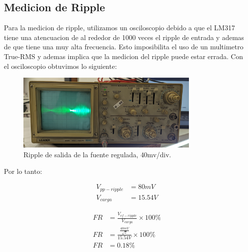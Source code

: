 \documentclass[chaptersright]{informeutn}
\begin{document}
      \subsection{Medicion de Ripple}
        Para la medicion de ripple, utilizamos un osciloscopio debido a que el LM317 tiene una atencuacion de al
        rededor de 1000 veces el ripple de entrada y ademas de que tiene una muy alta frecuencia. Esto imposibilita el
        uso de un multimetro True-RMS y ademas implica que la medicion del ripple puede estar errada. Con el
        osciloscopio obtuvimos lo siguiente:
        \begin{figure}[h!]
          \centering
          \includegraphics[width=0.8\textwidth]{pictures/reg_osc-ripp.jpg}
          \caption{Ripple de salida de la fuente regulada, 40mv/div.}
        \end{figure}

        Por lo tanto:
        \begin{figure}[h]
          \centering
          \begin{minipage}{0.4\textwidth}
            \begin{align*}
              V_{pp-ripple} &= 80mV\\[6pt]
              V_{carga} &= 15.54V
            \end{align*}
          \end{minipage}
          \begin{minipage}{0.4\textwidth}
            \begin{align*}
              FR &= \frac{V_{ef-ripple}}{V_{carga}} \times 100\%\\[6pt]
              FR &= \frac{\frac{40mV}{\sqrt{2}}}{15.54V} \times 100\%\\[6pt]
              FR &= 0.18\%
            \end{align*}
          \end{minipage}
        \end{figure}
\end{document}
